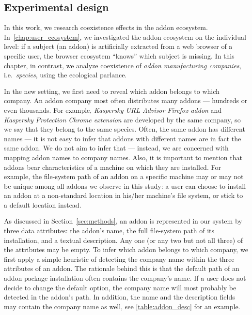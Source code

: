 \documentclass[ijoc,nonblindrev]{informs3} %
\numberwithin{equation}{subsection}
\begin{document}
\subsection{Experimental design}
\label{sec:experiment_des}

In this work, we research coexistence effects in the addon ecosystem. In~\autoref{chap:user_ecosystem}, we investigated the addon ecosystem on the individual level: if a subject (an addon) is artificially extracted from a web browser of a specific user, the browser ecosystem ``knows'' which subject is missing. In this chapter, in contrast, we analyze coexistence of \emph{addon manufacturing companies}, i.e.~\emph{species}, using the ecological parlance. 

In the new setting, we first need to reveal which addon belongs to which company. An addon company most often distributes many addons --- hundreds or even thousands. For example, \emph{Kaspersky URL Advisor Firefox addon} and \emph{Kaspersky Protection Chrome extension} are developed by the same company, so we say that they belong to the same species. Often, the same addon has different names --- it is not easy to infer that addons with different names are in fact the same addon. We do not aim to infer that --- instead, we are concerned with mapping addon names to company names. Also, it is important to mention that addons bear characteristics of a machine on which they are installed. For example, the file-system path of an addon on a specific machine may or may not be unique among all addons we observe in this study: a user can choose to install an addon at a non-standard location in his/her machine's file system, or stick to a default location instead.

As discussed in Section~\ref{sec:methods}, an addon is represented in our system by three data attributes: the addon's name, the full file-system path of its installation, and a textual description. Any one (or any two but not all three) of the attributes may be empty. To infer which addon belongs to which company, we first apply a simple heuristic of detecting the company name within the three attributes of an addon. The rationale behind this is that the default path of an addon package installation often contains the company's name. If a user does not decide to change the default option, the company name will most probably be detected in the addon's path. In addition, the name and the description fields may contain the company name as well, see \autoref{table:addon_desc} for an example.
\end{document}
